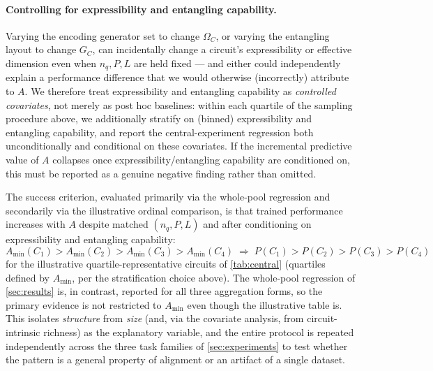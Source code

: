 \documentclass[11pt]{article}
\newcommand{\Omc}{\Omega_C}
\begin{document}
\paragraph{Controlling for expressibility and entangling capability.} Varying the encoding generator set to change $\Omc$, or varying the entangling layout to change $G_C$, can incidentally change a circuit's expressibility \citep{sim2019expressibility} or effective dimension \citep{abbas2021power} even when $n_q, P, L$ are held fixed --- and either could independently explain a performance difference that we would otherwise (incorrectly) attribute to $A$. We therefore treat expressibility and entangling capability as \emph{controlled covariates}, not merely as post hoc baselines: within each quartile of the sampling procedure above, we additionally stratify on (binned) expressibility and entangling capability, and report the central-experiment regression both unconditionally and conditional on these covariates. If the incremental predictive value of $A$ collapses once expressibility/entangling capability are conditioned on, this must be reported as a genuine negative finding rather than omitted.

The success criterion, evaluated primarily via the whole-pool regression and secondarily via the illustrative ordinal comparison, is that trained performance increases with $A$ despite matched $(n_q,P,L)$ and after conditioning on expressibility and entangling capability:
\[
    A_{\min}(C_1) > A_{\min}(C_2) > A_{\min}(C_3) > A_{\min}(C_4) \;\Longrightarrow\; P(C_1) > P(C_2) > P(C_3) > P(C_4)
\]
for the illustrative quartile-representative circuits of \cref{tab:central} (quartiles defined by $A_{\min}$, per the stratification choice above). The whole-pool regression of \cref{sec:results} is, in contrast, reported for all three aggregation forms, so the primary evidence is not restricted to $A_{\min}$ even though the illustrative table is. This isolates \emph{structure} from \emph{size} (and, via the covariate analysis, from circuit-intrinsic richness) as the explanatory variable, and the entire protocol is repeated independently across the three task families of \cref{sec:experiments} to test whether the pattern is a general property of alignment or an artifact of a single dataset.
\end{document}
